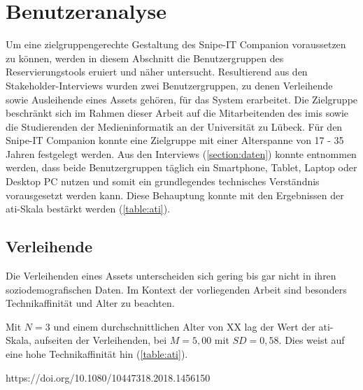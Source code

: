 \section{Benutzeranalyse}
\label{section:benutzer}
Um eine zielgruppengerechte Gestaltung des Snipe-IT Companion voraussetzen zu können, werden in
diesem Abschnitt die Benutzergruppen des Reservierungstools eruiert und näher untersucht.
Resultierend aus den Stakeholder-Interviews wurden zwei Benutzergruppen, zu denen Verleihende sowie
Ausleihende eines Assets gehören, für das System erarbeitet. Die Zielgruppe beschränkt sich im
Rahmen dieser Arbeit auf die Mitarbeitenden des \ac{imis} sowie die Studierenden der
Medieninformatik an der Universität zu Lübeck. Für den Snipe-IT Companion konnte eine Zielgruppe mit
einer Alterspanne von 17 - 35 Jahren festgelegt werden. Aus den Interviews (\ref{section:daten})
konnte entnommen werden, dass beide Benutzergruppen täglich ein Smartphone, Tablet, Laptop oder
Desktop PC nutzen und somit ein grundlegendes technisches Verständnis vorausgesetzt werden kann.
Diese Behauptung konnte mit den Ergebnissen der \ac{ati}-Skala bestärkt werden (\ref{table:ati}).


\subsection{Verleihende}
Die Verleihenden eines Assets unterscheiden sich gering bis gar nicht in ihren soziodemografischen
Daten. Im Kontext der vorliegenden Arbeit sind besonders Technikaffinität und Alter zu beachten.

Mit $N=3$ und einem durchschnittlichen Alter von XX lag der Wert der \ac{ati}-Skala, aufseiten der
Verleihenden, bei $M=5,00$ mit $SD=0,58$. Dies weist auf eine hohe Technikaffinität hin
(\ref{table:ati}).

\cite{franke_personal_2019}
https://doi.org/10.1080/10447318.2018.1456150 

